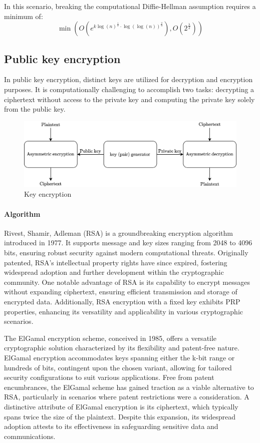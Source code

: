 In this scenario, breaking the computational Diffie-Hellman assumption requires a minimum of:
\[\min \left( O\left( e^{k\log(n)^{\frac{1}{3}}\cdot\log(\log(n))^{\frac{2}{3}}}\right), O\left(2^\frac{\lambda}{2}\right)\right)\]

\subsection{Public key encryption}
In public key encryption, distinct keys are utilized for decryption and encryption purposes. 
It is computationally challenging to accomplish two tasks: decrypting a ciphertext without access to the private key and computing the private key solely from the public key.
\begin{figure}[H]
    \centering
    \includegraphics[width=0.75\linewidth]{images/ke.png}
    \caption{Key encryption}
\end{figure}

\paragraph*{Algorithm}
Rivest, Shamir, Adleman (RSA) is a groundbreaking encryption algorithm introduced in 1977. 
It supports message and key sizes ranging from 2048 to 4096 bits, ensuring robust security against modern computational threats.
Originally patented, RSA's intellectual property rights have since expired, fostering widespread adoption and further development within the cryptographic community.
One notable advantage of RSA is its capability to encrypt messages without expanding ciphertext, ensuring efficient transmission and storage of encrypted data.
Additionally, RSA encryption with a fixed key exhibits PRP properties, enhancing its versatility and applicability in various cryptographic scenarios.

The ElGamal encryption scheme, conceived in 1985, offers a versatile cryptographic solution characterized by its flexibility and patent-free nature.
ElGamal encryption accommodates keys spanning either the k-bit range or hundreds of bits, contingent upon the chosen variant, allowing for tailored security configurations to suit various applications.
Free from patent encumbrances, the ElGamal scheme has gained traction as a viable alternative to RSA, particularly in scenarios where patent restrictions were a consideration.
A distinctive attribute of ElGamal encryption is its ciphertext, which typically spans twice the size of the plaintext. 
Despite this expansion, its widespread adoption attests to its effectiveness in safeguarding sensitive data and communications.

